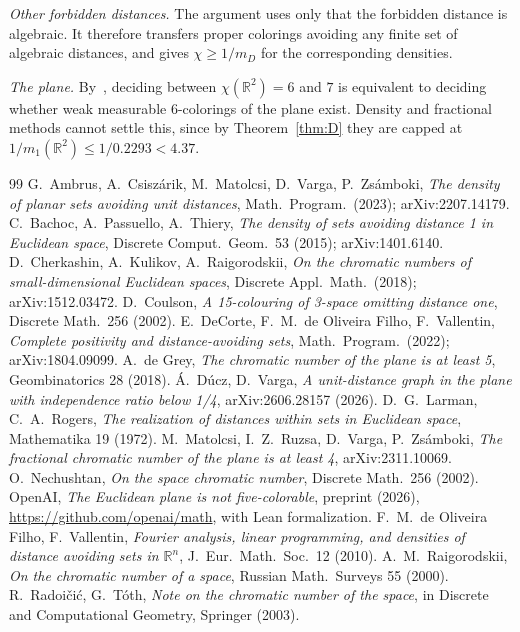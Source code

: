 \documentclass[11pt]{amsart}
\theoremstyle{definition}
\newcommand{\R}{\mathbb{R}}
\begin{document}
\emph{Other forbidden distances.} The argument uses only that the forbidden distance is algebraic. It therefore transfers proper colorings avoiding any finite set of algebraic distances, and gives $\chi\ge1/m_D$ for the corresponding densities.

\emph{The plane.} By~\cite[Theorem 1.3]{OAI}, deciding between $\chi(\R^2)=6$ and $7$ is equivalent to deciding whether weak measurable $6$-colorings of the plane exist. Density and fractional methods cannot settle this, since by Theorem~\ref{thm:D} they are capped at $1/m_1(\R^2)\le 1/0.2293<4.37$.

\begin{thebibliography}{99}
 G.~Ambrus, A.~Csisz\'arik, M.~Matolcsi, D.~Varga, P.~Zs\'amboki, \emph{The density of planar sets avoiding unit distances}, Math.\ Program.\ (2023); arXiv:2207.14179.
 C.~Bachoc, A.~Passuello, A.~Thiery, \emph{The density of sets avoiding distance 1 in Euclidean space}, Discrete Comput.\ Geom.\ 53 (2015); arXiv:1401.6140.
 D.~Cherkashin, A.~Kulikov, A.~Raigorodskii, \emph{On the chromatic numbers of small-dimensional Euclidean spaces}, Discrete Appl.\ Math.\ (2018); arXiv:1512.03472.
 D.~Coulson, \emph{A 15-colouring of 3-space omitting distance one}, Discrete Math.\ 256 (2002).
 E.~DeCorte, F.~M.~de Oliveira Filho, F.~Vallentin, \emph{Complete positivity and distance-avoiding sets}, Math.\ Program.\ (2022); arXiv:1804.09099.
 A.~de Grey, \emph{The chromatic number of the plane is at least 5}, Geombinatorics 28 (2018).
 \'A.~D\'ucz, D.~Varga, \emph{A unit-distance graph in the plane with independence ratio below 1/4}, arXiv:2606.28157 (2026).
 D.~G.~Larman, C.~A.~Rogers, \emph{The realization of distances within sets in Euclidean space}, Mathematika 19 (1972).
 M.~Matolcsi, I.~Z.~Ruzsa, D.~Varga, P.~Zs\'amboki, \emph{The fractional chromatic number of the plane is at least 4}, arXiv:2311.10069.
 O.~Nechushtan, \emph{On the space chromatic number}, Discrete Math.\ 256 (2002).
 OpenAI, \emph{The Euclidean plane is not five-colorable}, preprint (2026), \url{https://github.com/openai/math}, with Lean formalization.
 F.~M.~de Oliveira Filho, F.~Vallentin, \emph{Fourier analysis, linear programming, and densities of distance avoiding sets in $\R^n$}, J.\ Eur.\ Math.\ Soc.\ 12 (2010).
 A.~M.~Raigorodskii, \emph{On the chromatic number of a space}, Russian Math.\ Surveys 55 (2000).
 R.~Radoi\v{c}i\'c, G.~T\'oth, \emph{Note on the chromatic number of the space}, in Discrete and Computational Geometry, Springer (2003).
\end{thebibliography}
\end{document}
